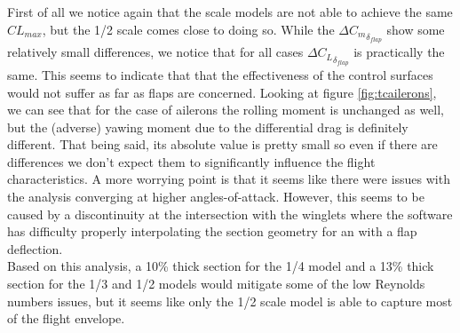 \documentclass[titlepage,10pt]{article}
\begin{document}
First of all we notice again that the scale models are not able to achieve the same $CL_{max}$, but the 1/2 scale comes close to doing so. While the $\Delta {C_m}_{\delta_{flap}}$ show some relatively small differences, we notice that for all cases $\Delta {C_L}_{\delta_{flap}}$ is practically the same. This seems to indicate that that the effectiveness of the control surfaces would not suffer as far as flaps are concerned. Looking at figure \ref{fig:tcailerons}, we can see that for the case of ailerons the rolling moment is unchanged as well, but the (adverse) yawing moment due to the differential drag is definitely different. That being said, its absolute value is pretty small so even if there are differences we don't expect them to significantly influence the flight characteristics. A more worrying point is that it seems like there were issues with the analysis converging at higher angles-of-attack. However, this seems to be caused by a discontinuity at the intersection with the winglets where the software has difficulty properly interpolating the section geometry for an with a flap deflection.\\

Based on this analysis, a 10\% thick section for the 1/4 model and a 13\% thick section for the 1/3 and 1/2 models would mitigate some of the low Reynolds numbers issues, but it seems like only the 1/2 scale model is able to capture most of the flight envelope.
\end{document}
